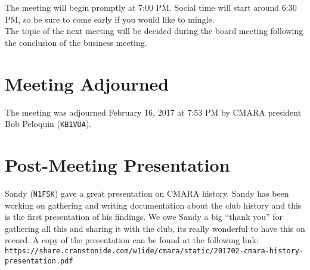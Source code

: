 \documentclass[10pt,letterpaper]{article}
\begin{document}
\noindent
The meeting will begin promptly at 7:00 PM. Social time will start around 6:30 PM, so be sure to come early if you would like to mingle.\\

\noindent
The topic of the next meeting will be decided during the board meeting following the conclusion of the business meeting.

\section{Meeting Adjourned}
The meeting was adjourned February 16, 2017 at 7:53 PM by CMARA president Bob Peloquin (\texttt{KB1VUA}).

\section{Post-Meeting Presentation}
Sandy (\texttt{N1FSK}) gave a great presentation on CMARA history. Sandy has been working on gathering and writing documentation about the club history and this is the first presentation of his findings. We owe Sandy a big ``thank you'' for gathering all this and sharing it with the club, its really wonderful to have this on record. A copy of the presentation can be found at the following link:\\

\noindent
\texttt{https://share.cranstonide.com/w1ide/cmara/static/201702-cmara-history-presentation.pdf}
\end{document}
